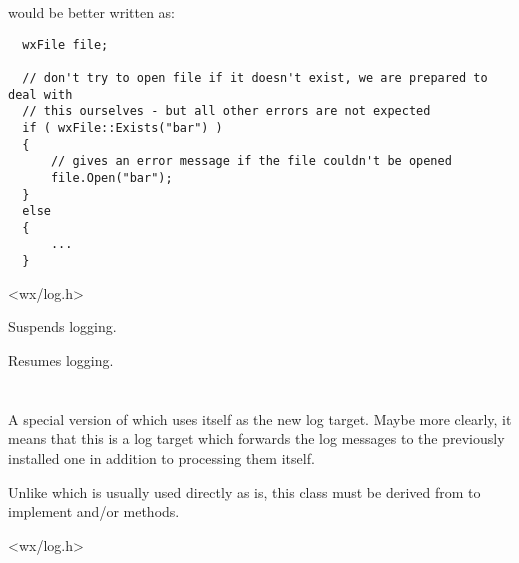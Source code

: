 would be better written as:

{\small
\begin{verbatim}
  wxFile file;

  // don't try to open file if it doesn't exist, we are prepared to deal with
  // this ourselves - but all other errors are not expected
  if ( wxFile::Exists("bar") )
  {
      // gives an error message if the file couldn't be opened
      file.Open("bar");
  }
  else
  {
      ...
  }
\end{verbatim}
}




<wx/log.h>




Suspends logging.


Resumes logging.


\section{}\label{wxlogpassthrough}

A special version of  which uses itself as the
new log target. Maybe more clearly, it means that this is a log target which
forwards the log messages to the previously installed one in addition to
processing them itself.

Unlike  which is usually used directly as is,
this class must be derived from to implement 
and/or  methods.




<wx/log.h>


\label{wxlogpassthroughctor}

